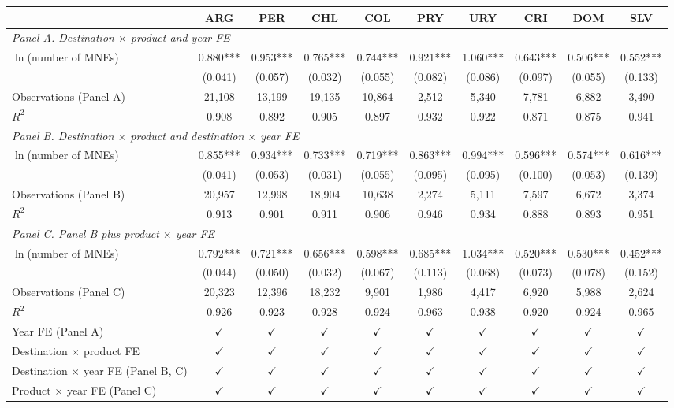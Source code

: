\begin{tabular}{l*{9}{c}}
\toprule
 & ARG & PER & CHL & COL & PRY & URY & CRI & DOM & SLV \\
\midrule
\multicolumn{10}{l}{\textit{Panel A. Destination $\times$ product and year FE}} \\
$\ln$(number of MNEs) & 0.880*** & 0.953*** & 0.765*** & 0.744*** & 0.921*** & 1.060*** & 0.643*** & 0.506*** & 0.552*** \\
 & (0.041) & (0.057) & (0.032) & (0.055) & (0.082) & (0.086) & (0.097) & (0.055) & (0.133) \\
Observations (Panel A) & 21,108 & 13,199 & 19,135 & 10,864 & 2,512 & 5,340 & 7,781 & 6,882 & 3,490 \\
$R^2$ & 0.908 & 0.892 & 0.905 & 0.897 & 0.932 & 0.922 & 0.871 & 0.875 & 0.941 \\
\midrule
\multicolumn{10}{l}{\textit{Panel B. Destination $\times$ product and destination $\times$ year FE}} \\
$\ln$(number of MNEs) & 0.855*** & 0.934*** & 0.733*** & 0.719*** & 0.863*** & 0.994*** & 0.596*** & 0.574*** & 0.616*** \\
 & (0.041) & (0.053) & (0.031) & (0.055) & (0.095) & (0.095) & (0.100) & (0.053) & (0.139) \\
Observations (Panel B) & 20,957 & 12,998 & 18,904 & 10,638 & 2,274 & 5,111 & 7,597 & 6,672 & 3,374 \\
$R^2$ & 0.913 & 0.901 & 0.911 & 0.906 & 0.946 & 0.934 & 0.888 & 0.893 & 0.951 \\
\midrule
\multicolumn{10}{l}{\textit{Panel C. Panel B plus product $\times$ year FE}} \\
$\ln$(number of MNEs) & 0.792*** & 0.721*** & 0.656*** & 0.598*** & 0.685*** & 1.034*** & 0.520*** & 0.530*** & 0.452*** \\
 & (0.044) & (0.050) & (0.032) & (0.067) & (0.113) & (0.068) & (0.073) & (0.078) & (0.152) \\
Observations (Panel C) & 20,323 & 12,396 & 18,232 & 9,901 & 1,986 & 4,417 & 6,920 & 5,988 & 2,624 \\
$R^2$ & 0.926 & 0.923 & 0.928 & 0.924 & 0.963 & 0.938 & 0.920 & 0.924 & 0.965 \\
\midrule
Year FE (Panel A) & $\checkmark$ & $\checkmark$ & $\checkmark$ & $\checkmark$ & $\checkmark$ & $\checkmark$ & $\checkmark$ & $\checkmark$ & $\checkmark$ \\
Destination $\times$ product FE & $\checkmark$ & $\checkmark$ & $\checkmark$ & $\checkmark$ & $\checkmark$ & $\checkmark$ & $\checkmark$ & $\checkmark$ & $\checkmark$ \\
Destination $\times$ year FE (Panel B, C) & $\checkmark$ & $\checkmark$ & $\checkmark$ & $\checkmark$ & $\checkmark$ & $\checkmark$ & $\checkmark$ & $\checkmark$ & $\checkmark$ \\
Product $\times$ year FE (Panel C) & $\checkmark$ & $\checkmark$ & $\checkmark$ & $\checkmark$ & $\checkmark$ & $\checkmark$ & $\checkmark$ & $\checkmark$ & $\checkmark$ \\
\bottomrule
\end{tabular}
